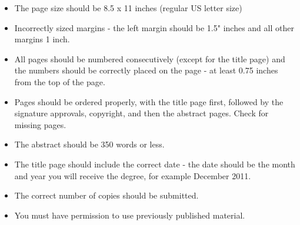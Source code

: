 \begin{itemize}
\item The page size should be 8.5  x 11 inches (regular US letter size)
\item	Incorrectly sized margins - the left margin should be 1.5" inches and all other margins 1 inch.
\item	All pages should be numbered consecutively (except for the title page) and the numbers should be correctly placed on the page - at least 0.75 inches from the top of the page.  
\item Pages should be ordered properly, with the title page first, followed by the signature approvals, copyright, and then the abstract pages. Check for missing pages.
\item	The abstract should be 350 words or less.
\item	The title page should include the correct date - the date should be the month and year you will receive the degree, for example December 2011.
\item	The correct number of copies should be submitted.
\item	You must have permission to use previously published material.

\end{itemize}

